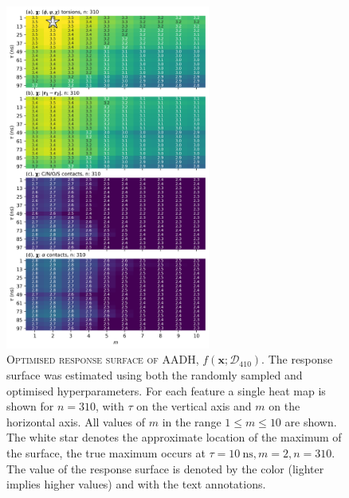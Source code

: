 \begin{figure}
    \centering
    \includegraphics[width=0.6\textwidth]{chapters/msm_optimization/figures/aadh_response_surface_d_opt.png}
    \caption[Optimised response surface of AADH]{\textsc{Optimised response surface of AADH, $f\left(\mathbf{x}; \mathcal{D}_{410}\right)$}. The response surface was estimated using both the randomly sampled and optimised hyperparameters. For each feature a single heat map is shown for $n=310$, with $\tau$ on the vertical axis and $m$ on the horizontal axis. All values of $m$ in the range $1\le m \le 10$ are shown. The white star denotes the approximate location of the maximum of the surface, the true maximum occurs at $\tau=\SI{10}{\nano\second}, m=2, n=310$. The value of the response surface is denoted by the color (lighter implies higher values) and with the text annotations.}
    \label{fig:aadh_rsm_opt}
\end{figure}


